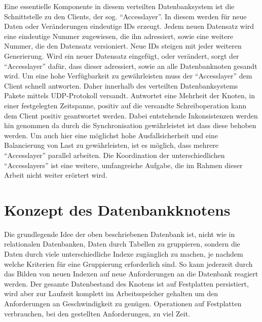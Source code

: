 \documentclass[a4paper,11pt,oneside,%
headsepline,												%
footsepline,												%
bibtotocnumbered									%
]{scrreprt}
\begin{document}
Eine essentielle Komponente in diesem verteilten Datenbanksystem ist die Schnittstelle zu den Clients, der sog. \enquote{Accesslayer}. In diesem werden für neue Daten oder Veränderungen eindeutige IDs erzeugt. Jedem neuen Datensatz wird eine eindeutige Nummer zugewiesen, die ihn adressiert, sowie eine weitere Nummer, die den Datensatz versioniert. Neue IDs steigen mit jeder weiteren Generierung. Wird ein neuer Datensatz eingefügt, oder verändert, sorgt der \enquote{Accesslayer} dafür, dass dieser adressiert, sowie an alle Datenbanknoten gesandt wird. Um eine hohe Verfügbarkeit zu gewährleisten muss der \enquote{Accesslayer} dem Client schnell antworten. Daher innerhalb des verteilten Datenbanksystems Pakete mittels UDP-Protokoll versandt. Antwortet eine Mehrheit der Knoten, in einer festgelegten Zeitspanne, positiv auf die versandte Schreiboperation kann dem Client positiv geantwortet werden. Dabei entstehende Inkonsistenzen werden hin genommen da durch die Synchronisation gewährleistet ist dass diese behoben werden. Um auch hier eine möglichst hohe Ausfallsicherheit und eine Balancierung von Last zu gewährleisten, ist es möglich, dass mehrere \enquote{Accesslayer} parallel arbeiten. Die Koordination der unterschiedlichen \enquote{Accesslayers} ist eine weitere, umfangreiche Aufgabe, die im Rahmen dieser Arbeit nicht weiter erörtert wird.

\section{Konzept des Datenbankknotens}
\label{sec:DBConcept} 

Die grundlegende Idee der oben beschriebenen Datenbank ist, nicht wie in relationalen Datenbanken, Daten durch Tabellen zu gruppieren, sondern die Daten durch viele unterschiedliche Indexe zugänglich zu machen, je nachdem welche Kriterien für eine Gruppierung erforderlich sind. So kann jederzeit durch das Bilden von neuen Indexen auf neue Anforderungen an die Datenbank reagiert werden. Der gesamte Datenbestand des Knotens ist auf Festplatten persistiert, wird aber zur Laufzeit komplett im Arbeitsspeicher gehalten um den Anforderungen an Geschwindigkeit zu genügen. Operationen auf Festplatten verbrauchen, bei den gestellten Anforderungen, zu viel Zeit.\\
\end{document}
